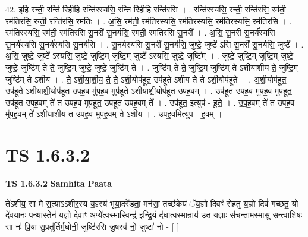 \documentclass[17pt]{extarticle}
\begin{document}
42. इ॒हि॒ रन्ती॒ रन्ति॑ रिहीहि॒ रन्ति॑रस्यसि॒ रन्ति॑ रिहीहि॒ रन्ति॑रसि । . रन्ति॑रस्यसि॒ रन्ती॒ रन्ति॑रसि॒ रम॑ती॒ रम॑तिरसि॒ रन्ती॒ रन्ति॑रसि॒ रम॑तिः । . अ॒सि॒ रम॑ती॒ रम॑तिरस्यसि॒ रम॑तिरस्यसि॒ रम॑तिरस्यसि॒ रम॑तिरसि । . रम॑तिरस्यसि॒ रम॑ती॒ रम॑तिरसि सू॒नरी॑ सू॒नर्य॑सि॒ रम॑ती॒ रम॑तिरसि सू॒नरी᳚ । . अ॒सि॒ सू॒नरी॑ सू॒नर्य॑स्यसि सू॒नर्य॑स्यसि सू॒नर्य॑स्यसि सू॒नर्य॑सि । . सू॒नर्य॑स्यसि सू॒नरी॑ सू॒नर्य॑सि॒ जुष्टे॒ जुष्टे॑ ऽसि सू॒नरी॑ सू॒नर्य॑सि॒ जुष्टे᳚ । . अ॒सि॒ जुष्टे॒ जुष्टे᳚ ऽस्यसि॒ जुष्टे॒ जुष्टि॒म् जुष्टि॒म् जुष्टे᳚ ऽस्यसि॒ जुष्टे॒ जुष्टि᳚म् । . जुष्टे॒ जुष्टि॒म् जुष्टि॒म् जुष्टे॒ जुष्टे॒ जुष्टि॑म् ते ते॒ जुष्टि॒म् जुष्टे॒ जुष्टे॒ जुष्टि॑म् ते । . जुष्टि॑म् ते ते॒ जुष्टि॒म् जुष्टि॑म् ते ऽशीयाशीय ते॒ जुष्टि॒म् जुष्टि॑म् ते ऽशीय । . ते॒ ऽशी॒या॒शी॒य॒ ते॒ ते॒ ऽशी॒योप॑हूत॒ उप॑हूते ऽशीय ते ते ऽशी॒योप॑हूते । . अ॒शी॒योप॑हूत॒ उप॑हूते ऽशीयाशी॒योप॑हूत उपह॒व मु॑पह॒व मुप॑हूते ऽशीयाशी॒योप॑हूत उपह॒वम् । . उप॑हूत उपह॒व मु॑पह॒व मुप॑हूत॒ उप॑हूत उपह॒वम् ते॑ त उपह॒व मुप॑हूत॒ उप॑हूत उपह॒वम् ते᳚ । . उप॑हूत॒ इत्युप॑ - हू॒ते॒ । . उ॒प॒ह॒वम् ते॑ त उपह॒व मु॑पह॒वम् ते॑ ऽशीयाशीय त उपह॒व मु॑पह॒वम् ते॑ ऽशीय । . उ॒प॒ह॒वमित्यु॑प - ह॒वम् । \newline
\pagebreak
{}
\section*{ TS 1.6.3.2 }

\textbf{TS 1.6.3.2 } \newline
\textbf{Samhita Paata} \newline

ते॑ऽशीय॒ सा मे॑ स॒त्याऽऽशीर॒स्य य॒ज्ञ्स्य॑ भूया॒दरे॑डता॒ मन॑सा॒ तच्छ॑केयं ॅय॒ज्ञो दिवꣳ॑ रोहतु य॒ज्ञो दिवं॑ गच्छतु॒ यो दे॑व॒यानः॒ पन्था॒स्तेन॑ य॒ज्ञो दे॒वाꣳ अप्ये᳚त्व॒स्मास्विन्द्र॑ इन्द्रि॒यं द॑धात्व॒स्मान्राय॑ उ॒त य॒ज्ञाः स॑चन्ताम॒स्मासु॑ सन्त्वा॒शिषः॒ सा नः॑ प्रि॒या सु॒प्रतू᳚र्तिर्म॒घोनी॒ जुष्टि॑रसि जु॒षस्व॑ नो॒ जुष्टा॑ नो - [ ] \newline
\end{document}
